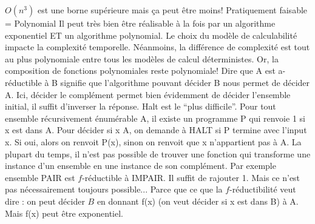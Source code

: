\begin{mcqs}
  {}
  {$O(n^{3})$ est une borne supérieure mais ça peut être moins!}
  {}
  {Pratiquement faisable = Polynomial}
  {Il peut très bien être réalisable à la fois par un algorithme exponentiel ET un algorithme polynomial.}
  {Le choix du modèle de calculabilité impacte la complexité temporelle. Néanmoins, la différence de complexité est tout au plus polynomiale entre tous les modèles de calcul déterministes. Or, la composition de fonctions polynomiales reste polynomiale!}
  {Dire que A est a-réductible à B signifie que l'algorithme pouvant décider B nous permet de décider A. Ici, décider le complément permet bien évidemment de décider l'ensemble initial, il suffit d'inverser la réponse.}
  {Halt est le ``plus difficile''. Pour tout ensemble récursivement énumérable A, il existe un programme P qui renvoie 1 si x est dans A. Pour décider si x \in A, on demande à HALT si P termine avec l'input x. Si oui, alors on renvoit P(x), sinon on renvoit que x n'appartient pas à A.}
  {La plupart du temps, il n'est pas possible de trouver une fonction qui transforme une instance d'un ensemble en une instance de son complément. Par exemple ensemble PAIR est $f$-réductible à IMPAIR. Il suffit de rajouter 1. Mais ce n'est pas nécessairement toujours possible...}
  {Parce que ce que la $f$-réductibilité veut dire : on peut décider $B$ en donnant f(x) (on veut décider si x est dans B) à A. Mais f(x) peut être exponentiel.}
\end{mcqs}
